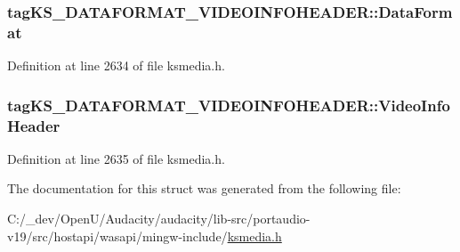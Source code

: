 \subsubsection[{\texorpdfstring{Data\+Format}{DataFormat}}]{ tag\+K\+S\+\_\+\+D\+A\+T\+A\+F\+O\+R\+M\+A\+T\+\_\+\+V\+I\+D\+E\+O\+I\+N\+F\+O\+H\+E\+A\+D\+E\+R\+::\+Data\+Format}\hypertarget{structtag_k_s___d_a_t_a_f_o_r_m_a_t___v_i_d_e_o_i_n_f_o_h_e_a_d_e_r_a5630b26b6566a488da6eb2deb2a0c471}{}\label{structtag_k_s___d_a_t_a_f_o_r_m_a_t___v_i_d_e_o_i_n_f_o_h_e_a_d_e_r_a5630b26b6566a488da6eb2deb2a0c471}


Definition at line 2634 of file ksmedia.\+h.

\subsubsection[{\texorpdfstring{Video\+Info\+Header}{VideoInfoHeader}}]{ tag\+K\+S\+\_\+\+D\+A\+T\+A\+F\+O\+R\+M\+A\+T\+\_\+\+V\+I\+D\+E\+O\+I\+N\+F\+O\+H\+E\+A\+D\+E\+R\+::\+Video\+Info\+Header}\hypertarget{structtag_k_s___d_a_t_a_f_o_r_m_a_t___v_i_d_e_o_i_n_f_o_h_e_a_d_e_r_abd7c5a3743bec1f15c6aae1b4b328407}{}\label{structtag_k_s___d_a_t_a_f_o_r_m_a_t___v_i_d_e_o_i_n_f_o_h_e_a_d_e_r_abd7c5a3743bec1f15c6aae1b4b328407}


Definition at line 2635 of file ksmedia.\+h.



The documentation for this struct was generated from the following file\+:\begin{DoxyCompactItemize}
\item 
C\+:/\+\_\+dev/\+Open\+U/\+Audacity/audacity/lib-\/src/portaudio-\/v19/src/hostapi/wasapi/mingw-\/include/\hyperlink{ksmedia_8h}{ksmedia.\+h}\end{DoxyCompactItemize}
